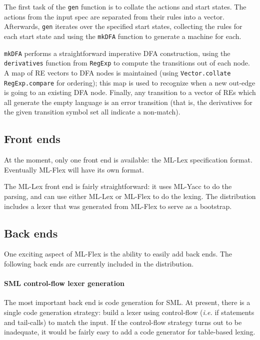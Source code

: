 \documentclass[11pt]{article}
\newcommand{\flex}{ML-Flex}
\newcommand{\ie}{{\em i.e.}}
\newcommand{\nm}[1]{\texttt{#1}}
\begin{document}
The first task of the \nm{gen} function is to collate the actions and start
states.  The actions from the input spec are separated from their rules into a
vector.  Afterwards, \nm{gen} iterates over the specified start states,
collecting the rules for each start state and using the \nm{mkDFA} function to
generate a machine for each.

\nm{mkDFA} performs a straightforward imperative DFA construction, using
the \nm{derivatives} function from \nm{RegExp} to compute the transitions out of
each node. A map of RE vectors to DFA nodes is maintained (using
\nm{Vector.collate RegExp.compare} for ordering); this map is used to recognize
when a new out-edge is going to an existing DFA node.  Finally, any transition
to a vector of REs which all generate the empty language is an error transition
(that is, the derivatives for the given transition symbol set all indicate a
non-match).

\subsection{Front ends}

At the moment, only one front end is available: the ML-Lex specification
format.  Eventually \flex{} will have its own format.

The ML-Lex front end is fairly straightforward: it uses ML-Yacc to do the
parsing, and can use either ML-Lex or \flex{} to do the lexing.  The
distribution includes a lexer that was generated from ML-Flex to serve as a
bootstrap.

\subsection{Back ends}

One exciting aspect of \flex{} is the ability to easily add back ends.  The
following back ends are currently included in the distribution.

\paragraph{SML control-flow lexer generation}

The most important back end is code generation for SML.  At present, there is a
single code generation strategy: build a lexer using control-flow (\ie
if statements and tail-calls) to match the input.  If the control-flow strategy
turns out to be inadequate, it would be fairly easy to add a code
generator for table-based lexing.
\end{document}
